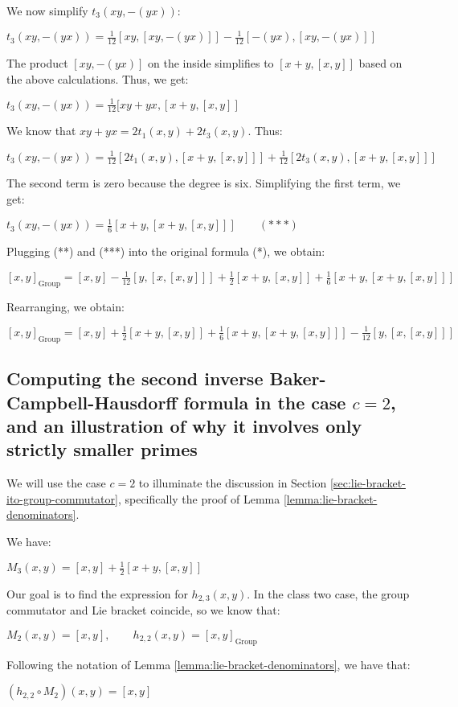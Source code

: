 We now simplify $t_3(xy,-(yx))$:

$t_3(xy,-(yx)) = \frac{1}{12}[xy,[xy,-(yx)]] - \frac{1}{12}[-(yx),[xy,-(yx)]]$

The product $[xy,-(yx)]$ on the inside simplifies to $[x + y,[x,y]]$
based on the above calculations. Thus, we get:

$t_3(xy,-(yx)) = \frac{1}{12}[xy + yx,[x + y,[x,y]]$

We know that $xy + yx = 2t_1(x,y) + 2t_3(x,y)$. Thus:

$t_3(xy,-(yx)) = \frac{1}{12}[2t_1(x,y),[x+y,[x,y]]] + \frac{1}{12}[2t_3(x,y),[x+y,[x,y]]]$

The second term is zero because the degree is six. Simplifying the first term, we get:

$t_3(xy,-(yx)) = \frac{1}{6}[x + y,[x+y,[x,y]]] \qquad (***)$

Plugging (**) and (***) into the original formula (*), we obtain:

$[x,y]_{\text{Group}} = [x,y] - \frac{1}{12}[y,[x,[x,y]]] + \frac{1}{2}[x + y,[x,y]] + \frac{1}{6}[x + y,[x + y,[x,y]]]$ 

Rearranging, we obtain:

$[x,y]_{\text{Group}} = [x,y] + \frac{1}{2}[x + y,[x,y]] + \frac{1}{6}[x + y,[x + y,[x,y]]] - \frac{1}{12}[y,[x,[x,y]]]$ 

\subsection{Computing the second inverse Baker-Campbell-Hausdorff formula in the case $c = 2$, and an illustration of why it involves only strictly smaller primes}\label{appsec:lie-bracket-denominators-illustration}

We will use the case $c = 2$ to illuminate the discussion in Section
\ref{sec:lie-bracket-ito-group-commutator}, specifically the proof of
Lemma \ref{lemma:lie-bracket-denominators}.

We have:

$M_3(x,y) = [x,y] + \frac{1}{2}[x + y,[x,y]]$

Our goal is to find the expression for $h_{2,3}(x,y)$. In the class
two case, the group commutator and Lie bracket coincide, so we know
that:

$M_2(x,y) = [x,y], \qquad h_{2,2}(x,y) = [x,y]_{\text{Group}}$

Following the notation of Lemma \ref{lemma:lie-bracket-denominators}, we have that:

$(h_{2,2} \circ M_2)(x,y) = [x,y]$

